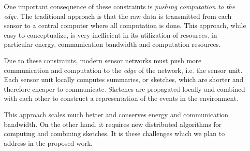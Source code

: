 One important consequence of these constraints is {\em pushing
  computation to the edge}. The traditional approach is that the raw data is transmitted from each sensor to a central computer where all computation is done. This approach, while easy to conceptualize, is very inefficient in its utilization of resources, in particular energy, communication bandwidth and computation resources.
  
Due to these constraints,  modern sensor networks must push more communication and computation to the {\em edge} of the network, i.e. the sensor unit. Each sensor unit
locally computes summaries, or sketches, which are shorter and
therefore cheaper to communicate. Sketches are propagated locally and combined with each other to construct a representation of the events in the environment. 

This approach scales much better and conserves energy and communication bandwidth. On the other hand, it requires new distributed algorithms for computing and combining sketches. It is these challenges which we plan to address in the proposed work.



